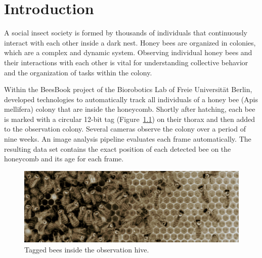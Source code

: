 \chapter{Introduction}
\label{ch:intro}

A social insect society is formed by thousands of individuals that continuously interact with each other inside a dark nest. 
Honey bees are organized in colonies, which are a complex and dynamic system.
Observing individual honey bees and their interactions with each other is vital for understanding collective behavior and the organization of tasks within the colony.

Within the BeesBook project of the Biorobotics Lab of Freie Universität Berlin, \textcite{wario2015automatic} developed technologies to automatically track all individuals of a honey bee (Apis mellifera) colony that are inside the honeycomb.
Shortly after hatching, each bee is marked with a circular 12-bit tag (Figure~\ref{fig:markers}) on their thorax and then added to the observation colony.
Several cameras observe the colony over a period of nine weeks. An image analysis pipeline evaluates each frame automatically. The resulting data set contains the exact position of each detected bee on the honeycomb and its age for each frame.

\begin{figure}[b]
	\centering
	\includegraphics[width=1.0\textwidth]{Figures/markers}
	\caption{Tagged bees inside the observation hive.}
	\label{fig:markers}
\end{figure}

